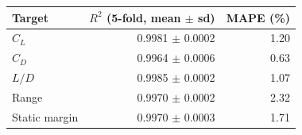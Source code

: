 \begin{tabular}{@{}lrr@{}}
\toprule
Target & $R^2$ (5-fold, mean $\pm$ sd) & MAPE (\%) \\
\midrule
$C_L$ & 0.9981 $\pm$ 0.0002 & 1.20 \\
$C_D$ & 0.9964 $\pm$ 0.0006 & 0.63 \\
$L/D$ & 0.9985 $\pm$ 0.0002 & 1.07 \\
Range & 0.9970 $\pm$ 0.0002 & 2.32 \\
Static margin & 0.9970 $\pm$ 0.0003 & 1.71 \\
\bottomrule
\end{tabular}
